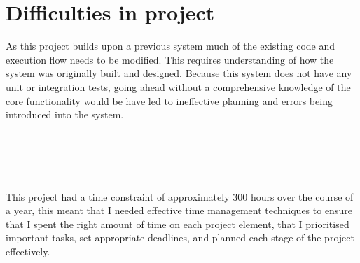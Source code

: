 \section{Difficulties in project}
As this project builds upon a previous system much of the existing code and execution flow needs to be modified. This requires understanding of how the system was originally built and designed. Because this system does not have any unit or integration tests, going ahead without a comprehensive knowledge of the core functionality would be have led to ineffective planning and errors being introduced into the system.
\\\\
\\\\
\\\\
This project had a time constraint of approximately 300 hours over the course of a year, this meant that I needed effective time management techniques to ensure that I spent the right amount of time on each project element, that I prioritised important tasks, set appropriate deadlines, and planned each stage of the project effectively.
